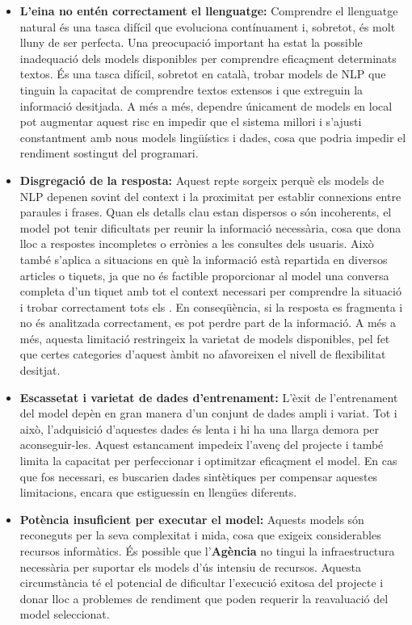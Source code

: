 \begin{itemize}
    \item \textbf{L'eina no entén correctament el llenguatge:} Comprendre el llenguatge natural és una tasca difícil que evoluciona contínuament i, sobretot, és molt lluny de ser perfecta. Una preocupació important ha estat la possible inadequació dels models disponibles per comprendre eficaçment determinats textos. És una tasca difícil, sobretot en català, trobar models de NLP que tinguin la capacitat de comprendre textos extensos i que extreguin la informació desitjada. A més a més, dependre únicament de models en local pot augmentar aquest risc en impedir que el sistema millori i s'ajusti constantment amb nous models lingüístics i dades, cosa que podria impedir el rendiment sostingut del programari.
    \item \textbf{Disgregació de la resposta:} Aquest repte sorgeix perquè els models de NLP depenen sovint del context i la proximitat per establir connexions entre paraules i frases. Quan els detalls clau estan dispersos o són incoherents, el model pot tenir dificultats per reunir la informació necessària, cosa que dona lloc a respostes incompletes o errònies a les consultes dels usuaris. Això també s'aplica a situacions en què la informació està repartida en diversos articles o tiquets, ja que no és factible proporcionar al model una conversa completa d'un tiquet amb tot el context necessari per comprendre la situació i trobar correctament tots els . En conseqüència, si la resposta es fragmenta i no és analitzada correctament, es pot perdre part de la informació. A més a més, aquesta limitació restringeix la varietat de models disponibles, pel fet que certes categories d'aquest àmbit no afavoreixen el nivell de flexibilitat desitjat.
    \item \textbf{Escassetat i varietat de dades d'entrenament:} L'èxit de l'entrenament del model depèn en gran manera d'un conjunt de dades ampli i variat. Tot i això, l'adquisició d'aquestes dades és lenta i hi ha una llarga demora per aconseguir-les. Aquest estancament impedeix l'avenç del projecte i també limita la capacitat per perfeccionar i optimitzar eficaçment el model. En cas que fos necessari, es buscarien dades sintètiques per compensar aquestes limitacions, encara que estiguessin en llengües diferents.
    \item \textbf{Potència insuficient per executar el model:} Aquests models són reconeguts per la seva complexitat i mida, cosa que exigeix considerables recursos informàtics. És possible que l'\textbf{Agència} no tingui la infraestructura necessària per suportar els models d'ús intensiu de recursos. Aquesta circumstància té el potencial de dificultar l'execució exitosa del projecte i donar lloc a problemes de rendiment que poden requerir la reavaluació del model seleccionat.

\end{itemize}
